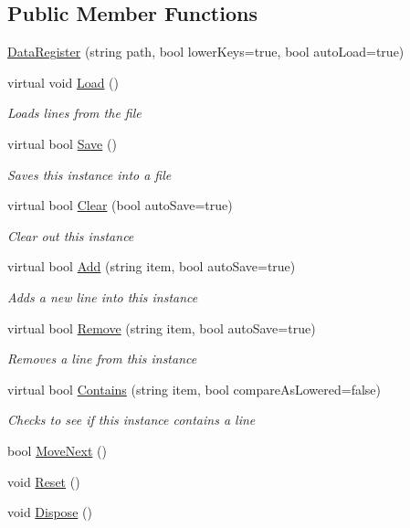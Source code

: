 \subsection*{Public Member Functions}
\begin{DoxyCompactItemize}
\item 
\hyperlink{class_o_t_a_1_1_misc_1_1_data_register_ac4437536f525d636878a78c0f9cc67a7}{Data\+Register} (string path, bool lower\+Keys=true, bool auto\+Load=true)
\item 
virtual void \hyperlink{class_o_t_a_1_1_misc_1_1_data_register_ac7c1c53a6f260e6fff4607dc7fe70e0d}{Load} ()
\begin{DoxyCompactList}\small\item\em Loads lines from the file \end{DoxyCompactList}\item 
virtual bool \hyperlink{class_o_t_a_1_1_misc_1_1_data_register_ae88116716437b666e9c2d94a18a397d9}{Save} ()
\begin{DoxyCompactList}\small\item\em Saves this instance into a file \end{DoxyCompactList}\item 
virtual bool \hyperlink{class_o_t_a_1_1_misc_1_1_data_register_a6c3a16aee05b5b7eff8ffc75f9077f4f}{Clear} (bool auto\+Save=true)
\begin{DoxyCompactList}\small\item\em Clear out this instance \end{DoxyCompactList}\item 
virtual bool \hyperlink{class_o_t_a_1_1_misc_1_1_data_register_a9b751b7b7339286a2a18be1968ad5f63}{Add} (string item, bool auto\+Save=true)
\begin{DoxyCompactList}\small\item\em Adds a new line into this instance \end{DoxyCompactList}\item 
virtual bool \hyperlink{class_o_t_a_1_1_misc_1_1_data_register_ad257b99b350d8b78b04a57123240df45}{Remove} (string item, bool auto\+Save=true)
\begin{DoxyCompactList}\small\item\em Removes a line from this instance \end{DoxyCompactList}\item 
virtual bool \hyperlink{class_o_t_a_1_1_misc_1_1_data_register_a1b37c0b26cda3e69416fd0660774af3c}{Contains} (string item, bool compare\+As\+Lowered=false)
\begin{DoxyCompactList}\small\item\em Checks to see if this instance contains a line \end{DoxyCompactList}\item 
bool \hyperlink{class_o_t_a_1_1_misc_1_1_data_register_a0fda285f68e1b0b07f4ebed7c39765a9}{Move\+Next} ()
\item 
void \hyperlink{class_o_t_a_1_1_misc_1_1_data_register_a286d321a6f4aa6f175240e8123864934}{Reset} ()
\item 
void \hyperlink{class_o_t_a_1_1_misc_1_1_data_register_ae5ccb7a5d0291951dcaa070b29e02c0a}{Dispose} ()
\end{DoxyCompactItemize}
